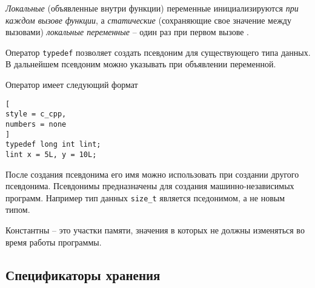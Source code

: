 \documentclass[%
	11pt,
	a4paper,
	utf8,
		]{article}
\begin{document}
\emph{Локальные} (объявленные внутри функции) переменные инициализируются \emph{при каждом вызове функции}, а \emph{статические} (сохраняющие свое значение между вызовами) \emph{локальные переменные} -- один раз при первом вызове \cite[]{prokhorenok-prog-c:2020}.

Оператор \verb*|typedef| позволяет создать псевдоним для существующего типа данных. В дальнейшем псевдоним можно указывать при объявлении переменной. 

Оператор имеет следующий формат
\begin{lstlisting}[
style = c_cpp,
numbers = none
]
typedef long int lint;
lint x = 5L, y = 10L;
\end{lstlisting}

После создания псевдонима его имя можно использовать при создании другого псевдонима. Псевдонимы предназначены для создания машинно-независимых программ. Например тип данных \verb|size_t| является пседонимом, а не новым типом.

Константны -- это участки памяти, значения в которых не должны изменяться во время работы программы.

\subsection{Спецификаторы хранения}
\end{document}
